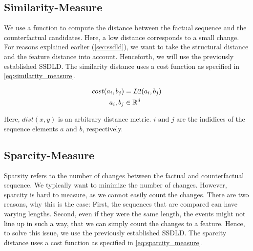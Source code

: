 \documentclass[./../../paper.tex]{subfiles}
\begin{document}
\subsection{Similarity-Measure}
We use a function to compute the distance between the factual sequence and the counterfactual candidates. Here, a low distance corresponds to a small change. For reasons explained earlier (\autoref{sec:ssdld}), we want to take the structural distance and the feature distance into account. Henceforth, we will use the previously established \gls{SSDLD}. 
The similarity distance uses a cost function as specified in \autoref{eq:similarity_measure}.

\begin{align}
    \label{eq:similarity_measure}
    cost(a_i, b_j)      & = L2(a_i, b_j) \\
    a_i,b_j        & \in \mathbb{R}^d \nonumber
\end{align}

\noindent Here, $dist(x,y)$ is an arbitrary distance metric. $i \text{ and } j$ are the indidices of the sequence elements $a \text{ and } b$, respectively.

\subsection{Sparcity-Measure}
Sparsity refers to the number of changes between the factual and counterfactual sequence. We typically want to minimize the number of changes. However, sparcity is hard to measure, as we cannot easily count the changes. There are two reasons, why this is the case: First, the sequences that are compared can have varying lengths. Second, even if they were the same length, the events might not line up in such a way, that we can simply count the changes to a feature. Hence, to solve this issue, we use the previously established \gls{SSDLD}. The sparcity distance uses a cost function as specified in \autoref{eq:sparcity_measure}.
\end{document}
